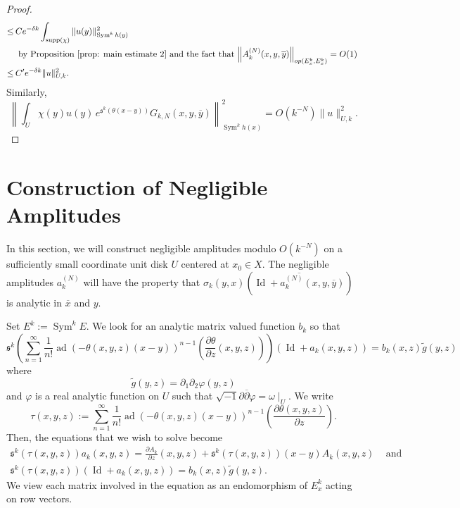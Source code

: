 \documentclass{amsart}
\theoremstyle{definition}
\theoremstyle{remark}
\numberwithin{equation}{section}
\newcommand{\deriv}[2]{\frac{\partial #1}{\partial #2}}
\DeclareMathOperator{\Sym}{Sym}
\DeclareMathOperator{\Id}{Id}
\DeclareMathOperator{\ad}{ad}
\begin{document}
\begin{proof}
\begin{align*}
    \leq \hspace{2pt} & C e^{-\delta k} \int_{\text{supp}(\chi)} \| u(y) \|_{\Sym^k h(y)}^2 \\
    & \text{ by Proposition \ref{prop: main estimate 2} and the fact that $\left \| A^{(N)}_k(x,y,\overline{y})\right \|_{op( E_x^k, E_x^k)} = O(1)$ } \\
    \leq  \hspace{2pt} & C'  e^{-\delta k}\|u\|_{U,k}^2.
\end{align*}
Similarly,
$$
 \left \|  \int_{U} \chi(y) u(y) \,  e^{\mathfrak{s}^k (\theta(x-y))} G_{k,N}(x,y,\overline{y}) \right \|_{\Sym^k h(x)}^2 = O(k^{-N}) \|u\|_{U,k}^2. 
$$






\end{proof}









\section{Construction of Negligible Amplitudes}

In this section, we will construct negligible amplitudes modulo $O(k^{-N})$ on a sufficiently small coordinate unit disk $U$ centered at $x_0 \in X$. The negligible amplitudes $a_k^{(N)}$ will have the property that $\sigma_k(y,x)\left ( \overline{\Id + a_k^{(N)}(x,y,\overline{y})} \right )$ is analytic in $\overline{x}$ and $y$. 

Set $E^k := \Sym^k E$. We look for an analytic matrix valued function $b_k$ so that
$$
\mathfrak{s}^k \left ( \sum_{n=1}^\infty \frac{1}{n!} \ad \left (-\theta (x,y,z)(x-y) \right )^{n-1} \left ( \deriv{\theta}{z} (x,y,z) \right )\right ) (\Id + a_k(x,y,z)) =   b_k(x,z) \tilde{g}(y,z)
$$
where
$$
\tilde{g}(y,z) =  \partial_1\partial_2 \varphi(y,z)
$$
and $\varphi$ is a real analytic function on $U$ such that $\sqrt{-1} \partial \overline{\partial}\varphi = \omega \mid_U$. We write
\begin{equation} \label{eq: tau}
\tau(x,y,z) := \sum_{n=1}^\infty \frac{1}{n!} \ad (-\theta(x,y,z)(x-y))^{n-1} \left ( \deriv{\theta(x,y,z)}{z}\right ).
\end{equation}
Then, the equations that we wish to solve become
\begin{equation} \label{eq: power series}
\begin{gathered}
\mathfrak{s}^k(\tau(x,y,z)) a_k(x,y,z)  = \deriv{A_k}{z}(x,y,z) + \mathfrak{s}^k (\tau(x,y,z))(x-y) A_k(x,y,z)  \hspace{10pt} \text{ and } \\
\mathfrak{s}^k \left ( \tau(x,y,z) \right ) (\Id + a_k(x,y,z)) =   b_k(x,z) \tilde{g}(y,z) .
\end{gathered}
\end{equation}
We view each matrix involved in the equation as an endomorphism of $E^k_x$ acting on row vectors.
\end{document}
